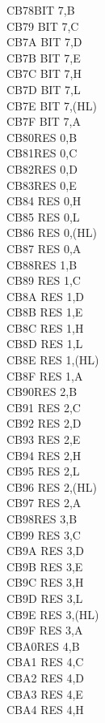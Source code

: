 \documentclass[twoside,openright,a4paper]{book}
\begin{document}
\begin{multicols}{3}
{\begin{tabbing}
	CB78\>BIT 7,B\\
	CB79\> 	BIT 7,C\\
	CB7A\> 	BIT 7,D\\
	CB7B\> 	BIT 7,E\\
	CB7C\> 	BIT 7,H\\
	CB7D\> 	BIT 7,L\\
	CB7E\> 	BIT 7,(HL)\\
	CB7F\> 	BIT 7,A\\
	CB80\>RES 0,B\\
	CB81\>RES 0,C\\
	CB82\>RES 0,D\\
	CB83\>RES 0,E\\
	CB84\> 	RES 0,H\\
	CB85\> 	RES 0,L\\
	CB86\> 	RES 0,(HL)\\
	CB87\> 	RES 0,A\\
	CB88\>RES 1,B\\
	CB89\> 	RES 1,C\\
	CB8A\> 	RES 1,D\\
	CB8B\> 	RES 1,E\\
	CB8C\> 	RES 1,H\\
	CB8D\> 	RES 1,L\\
	CB8E\> 	RES 1,(HL)\\
	CB8F\> 	RES 1,A\\
	CB90\>RES 2,B\\
	CB91\> 	RES 2,C\\
	CB92\> 	RES 2,D\\
	CB93\> 	RES 2,E\\
	CB94\> 	RES 2,H\\
	CB95\> 	RES 2,L\\
	CB96\> 	RES 2,(HL)\\
	CB97\> 	RES 2,A\\
	CB98\>RES 3,B\\
	CB99\> 	RES 3,C\\
	CB9A\> 	RES 3,D\\
	CB9B\> 	RES 3,E\\
	CB9C\> 	RES 3,H\\
	CB9D\> 	RES 3,L\\
	CB9E\> 	RES 3,(HL)\\
	CB9F\> 	RES 3,A\\
	CBA0\>RES 4,B\\
	CBA1\> 	RES 4,C\\
	CBA2\> 	RES 4,D\\
	CBA3\> 	RES 4,E\\
	CBA4\> 	RES 4,H\\

\end{tabbing}}
\end{multicols}
\end{document}
